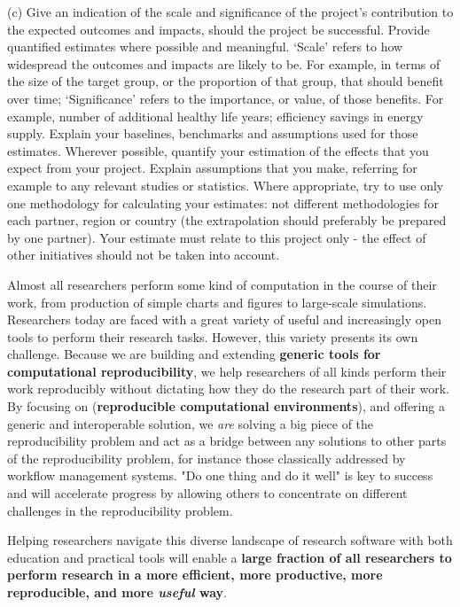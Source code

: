 \begin{draft}
{(c)	 Give an indication of the scale and significance of the project’s contribution to the expected outcomes and impacts, should the project be successful.  Provide quantified estimates where possible and meaningful.
	‘Scale’ refers to how widespread the outcomes and impacts are likely to be. For example, in terms of the size of the target group, or the proportion of that group, that should benefit over time; ‘Significance’ refers to the importance, or value, of those benefits. For example, number of additional healthy life years; efficiency savings in energy supply.
	Explain your baselines, benchmarks and assumptions used for those estimates. Wherever possible, quantify your estimation of the effects that you expect from your project. Explain assumptions that you make, referring for example to any relevant studies or statistics. Where appropriate, try to use only one methodology for calculating your estimates: not different methodologies for each partner, region or country (the extrapolation should preferably be prepared by one partner).
	Your estimate must relate to this project only - the effect of other initiatives should not be taken into account.
}
\end{draft}


Almost all researchers perform some kind of computation in the course of their work,
from production of simple charts and figures to large-scale simulations.
Researchers today are faced with a great variety of useful
and increasingly open tools to perform their research tasks.
However, this variety presents its own challenge.
Because we are building and extending \textbf{generic tools for computational reproducibility},
we help researchers of all kinds perform their work reproducibly without dictating
how they do the research part of their work.
By focusing on (\textbf{reproducible computational environments}),
and offering a generic and interoperable solution,
we \emph{are} solving a big piece of the reproducibility problem
and act as a bridge between any solutions to other parts of the reproducibility problem,
for instance those classically addressed by workflow management systems.
"Do one thing and do it well" is key to success and will accelerate progress
by allowing others to concentrate on different challenges in the reproducibility problem.

Helping researchers navigate this diverse landscape of research software
with both education and practical tools
will enable a \textbf{large fraction of all researchers to perform research in a more efficient,
more productive, more reproducible, and more \emph{useful} way}.


